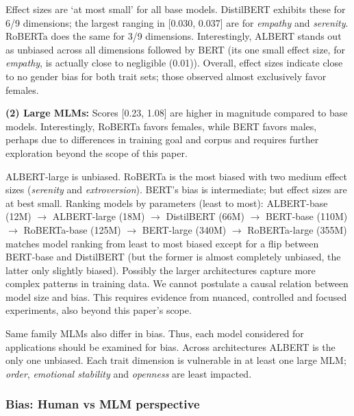 Effect sizes are `at most small' for all base models.
%
DistilBERT exhibits these for 6/9 dimensions; the largest ranging in [0.030, 0.037] are for \textit{empathy} and \textit{serenity}. 
%
RoBERTa does the same for 3/9 dimensions.
%
Interestingly, 
ALBERT stands out as unbiased across all dimensions followed by BERT (its one small effect size, for \textit{empathy}, is actually close to negligible (0.01)).
%
Overall, effect sizes indicate close to no gender bias for both trait sets; those observed almost exclusively favor females.

\vspace{0.3em} 
\noindent \textbf{(2) Large MLMs:} \label{results-discussion-large-mlms}
%
\noindent Scores [0.23, 1.08] are higher in magnitude compared to base models.  
%
Interestingly, RoBERTa favors females, while BERT favors males, perhaps due to differences in training goal and corpus and requires further exploration beyond the scope of this paper.

ALBERT-large is unbiased. 
RoBERTa is the most biased with two medium effect sizes (\textit{serenity} and \textit{extroversion}).
%
BERT's bias is intermediate; but effect sizes are at best small.
%
Ranking models by parameters (least to most):
    ALBERT-base (12M) $\rightarrow$ ALBERT-large (18M) $\rightarrow$ DistilBERT (66M) $\rightarrow$ BERT-base (110M) $\rightarrow$ RoBERTa-base (125M) $\rightarrow$ BERT-large (340M) $\rightarrow$ RoBERTa-large (355M)
    matches model ranking from least to most biased except for a flip between  
     BERT-base and DistilBERT (but the former is almost completely unbiased, the latter only slightly biased).
     Possibly the larger architectures capture more complex patterns in training data.
     We cannot postulate a causal relation between model size and bias. This requires evidence from nuanced, controlled and focused experiments, also beyond this paper's scope.


Same family MLMs also differ in bias. Thus, each model considered for applications should be examined for bias.
%
Across architectures ALBERT is the only one unbiased.
%
Each trait dimension is vulnerable in at least one large MLM;  \textit{order}, \textit{emotional stability} and \textit{openness} are least impacted.

\subsubsection{Bias: Human vs MLM perspective} \label{human-perspective}

